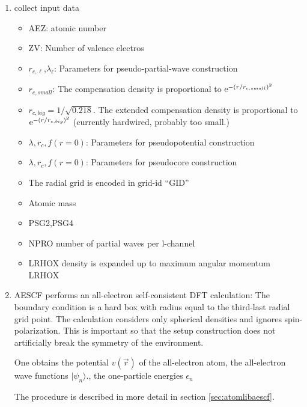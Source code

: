 \documentclass[11pt,a4paper]{report}
\begin{document}
\begin{enumerate}
\item collect input data
\begin{itemize}
\item AEZ: atomic number
\item ZV:  Number of valence electros
\item $r_{c,\ell}$,$\lambda_\ell$: Parameters for pseudo-partial-wave
  construction
\item $r_{c,small}$: The compensation density is proportional to
  $\mathrm{e}^{-(r/r_{c,small})^2}$
\item $r_{c,big}=1/\sqrt{0.218}$. The extended compensation density is
  proportional to $\mathrm{e}^{-(r/r_{c,big})^2}$ (currently hardwired,
  probably too small.)
\item $\lambda,r_c,f(r=0)$: Parameters for pseudopotential construction 
\item $\lambda,r_c,f(r=0)$: Parameters for pseudocore construction 
\item The radial grid is encoded in grid-id ``GID''
\item Atomic mass
\item PSG2,PSG4
\item NPRO number of partial waves per l-channel
\item LRHOX density is expanded up to maximum angular momentum LRHOX
\end{itemize}
\item AESCF performs an all-electron self-consistent DFT calculation: The
  boundary condition is a hard box with radius equal to the third-last
  radial grid point. The calculation considers only spherical
  densities and ignores spin-polarization. This is important so that the
  setup construction does not artificially break the symmetry of the
  environment.

  One obtains the potential $v(\vec{r})$ of the all-electron atom, the
  all-electron wave functions $|\psi_n\rangle$., the one-particle
  energies $\epsilon_n$

  The procedure is described in more detail in section
  \ref{sec:atomlibaescf}.


\end{enumerate}
\end{document}
